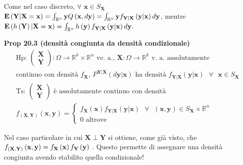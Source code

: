 \documentclass{article}
\begin{document}
Come nel caso discreto, $\forall $ $\mathbf{x}\in S_{\mathbf{X}}$ $\mathbf{E}%
\left( \mathbf{Y|X=x}\right) =\int_{%
\mathbb{R}
^{n}}\mathbf{y}Q\left( \mathbf{x},d\mathbf{y}\right) =\int_{%
\mathbb{R}
^{n}}\mathbf{y}f_{\mathbf{Y|X}}\left( \mathbf{y|x}\right) d\mathbf{y}$,
mentre $\mathbf{E}\left( h\left( \mathbf{Y}\right) |\mathbf{X=x}\right)
=\int_{%
\mathbb{R}
^{n}}h\left( \mathbf{y}\right) f_{\mathbf{Y|X}}\left( \mathbf{y|x}\right) d%
\mathbf{y}$.

\textbf{Prop 20.3 (densit\`{a} congiunta da densit\`{a} condizionale)}%
\begin{gather*}
\text{Hp: }\left( 
\begin{array}{c}
\mathbf{X} \\ 
\mathbf{Y}%
\end{array}%
\right) :\Omega \rightarrow 
\mathbb{R}
^{k}\times 
\mathbb{R}
^{n}\text{ ve. a., }\mathbf{X}:\Omega \rightarrow 
\mathbb{R}
^{k}\text{ v. a. assolutamente } \\
\text{continuo con densit\`{a} }f_{\mathbf{X}}\text{, }P^{\mathbf{Y|X}%
}\left( d\mathbf{y|x}\right) \text{ ha densit\`{a} }f_{\mathbf{Y|X}}\left( 
\mathbf{y|x}\right) \text{ }\forall \text{ }\mathbf{x}\in S_{\mathbf{X}} \\
\text{Ts: }\left( 
\begin{array}{c}
\mathbf{X} \\ 
\mathbf{Y}%
\end{array}%
\right) \text{ \`{e} assolutamente continuo con densit\`{a} } \\
f_{\left( \mathbf{X,Y}\right) }\left( \mathbf{x,y}\right) =\left\{ 
\begin{array}{c}
f_{\mathbf{X}}\left( \mathbf{x}\right) f_{\mathbf{Y|X}}\left( \mathbf{y|x}%
\right) \text{ }\forall \text{ }\left( \mathbf{x,y}\right) \in S_{\mathbf{X}%
}\times 
\mathbb{R}
^{n} \\ 
0\text{ altrove}%
\end{array}%
\right.
\end{gather*}

Nel caso particolare in cui $\mathbf{X\perp Y}$ si ottiene, come gi\`{a}
visto, che $f_{\left( \mathbf{X,Y}\right) }\left( \mathbf{x,y}\right) =f_{%
\mathbf{X}}\left( \mathbf{x}\right) f_{\mathbf{Y}}\left( \mathbf{y}\right) $%
. Questo permette di assegnare una densit\`{a} congiunta avendo stabilito
quella condizionale!
\end{document}
